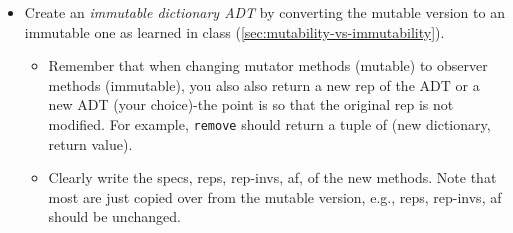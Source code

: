 \documentclass[oneside,11pt,dvipsnames]{book}
\newcommand{\code}[1]{\texttt{#1}}
\begin{document}
\begin{itemize}
\item Create an \emph{immutable dictionary ADT} by converting the mutable version to an immutable one as learned in class (\autoref{sec:mutability-vs-immutability}). 
\begin{itemize}
    \item Remember that when changing mutator methods (mutable) to observer methods (immutable), you also also return a new rep of the ADT or a new ADT (your choice)-the point is so that the original rep is not modified.  For example, \code{remove} should return a tuple of (new dictionary, return value).
    \item Clearly write the specs, reps, rep-invs, af,  of the new methods. Note that most are just copied over from the mutable version, e.g., reps, rep-invs, af should be unchanged.

\end{itemize}
\end{itemize}



    
    
\end{document}
